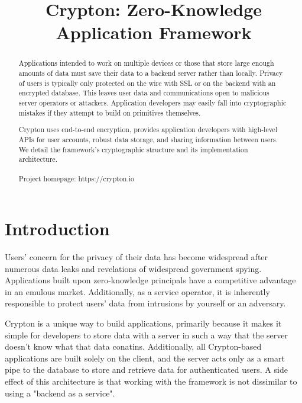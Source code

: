 \documentclass[conference]{IEEEtran}
\begin{document}
\title{Crypton: Zero-Knowledge Application Framework}

\author{
  \and
}

\maketitle

\begin{abstract}
Applications intended to work on multiple devices or those that
store large enough amounts of data must save their data to a backend server
rather than locally. Privacy of users is typically only protected on the wire
with SSL or on the backend with an encrypted database. This leaves user data
and communications open to malicious server operators or attackers.
Application developers may easily fall into cryptographic
mistakes if they attempt to build on primitives themselves.

Crypton uses end-to-end encryption, provides application developers
with high-level APIs for user accounts, robust data storage, and
sharing information between users. We detail the framework's cryptographic
structure and its implementation architecture.
\\
\\
Project homepage: https://crypton.io
\end{abstract}

\section{Introduction}
Users' concern for the privacy of their data has become widespread
after numerous data leaks and revelations of widespread government spying\cite{spying}.
Applications built upon zero-knowledge principals have a competitive
advantage in an emulous market. Additionally, as a service operator,
it is inherently responsible to protect users' data from intrusions
by yourself or an adversary.

Crypton is a unique way to build applications, primarily because it
makes it simple for developers to store data with a server in such a way
that the server doesn't know what that data conatins.
Additionally, all Crypton-based applications are built solely on the client,
and the server acts only as a smart pipe to the database to store and retrieve data
for authenticated users. A side effect of this architecture is that working with
the framework is not dissimilar to using a "backend as a service".
\end{document}
